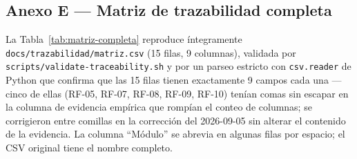 \subsection{Anexo E --- Matriz de trazabilidad completa}
\label{anexo:matriz}

La Tabla~\ref{tab:matriz-completa} reproduce íntegramente \texttt{docs/trazabilidad/matriz.csv} (15
filas, 9 columnas), validada por \texttt{scripts/validate-traceability.sh} y por un parseo estricto con
\texttt{csv.reader} de Python que confirma que las 15 filas tienen exactamente 9 campos cada una ---
cinco de ellas (RF-05, RF-07, RF-08, RF-09, RF-10) tenían comas sin escapar en la columna de evidencia
empírica que rompían el conteo de columnas; se corrigieron entre comillas en la corrección del 2026-09-05
sin alterar el contenido de la evidencia. La columna ``Módulo'' se abrevia en algunas filas por espacio;
el CSV original tiene el nombre completo.


